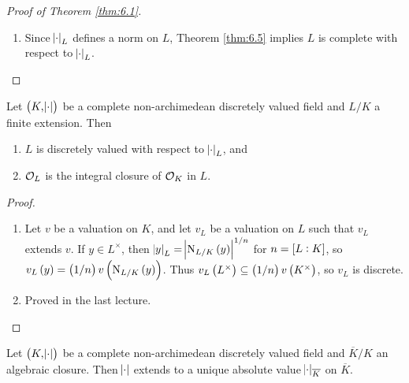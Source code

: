 \begin{proof}[Proof of Theorem \ref{thm:6.1}]
\begin{enumerate}
\begin{enumerate}[label=\arabic*.]
\end{enumerate}
To check $ \abs{\cdot}_L $ extends $ \abs{\cdot} $ use $ \N_{L / K}\br{x} = x^n $ for $ x \in K $. If $ \abs{\cdot}_L' $ is another absolute value on $ L $ extending $ \abs{\cdot} $, then note that $ \abs{\cdot}_L $ and $ \abs{\cdot}_L' $ are norms on $ L $. By Theorem \ref{thm:6.5}, $ \abs{\cdot}_L' $ and $ \abs{\cdot}_L $ induce the same topology on $ L $, so $ \abs{\cdot}_L' = \abs{\cdot}_L^c $ for some $ c > 0 $. Since $ \abs{\cdot}_L' $ extends $ \abs{\cdot} $, we have $ c = 1 $.
\item Since $ \abs{\cdot}_L $ defines a norm on $ L $, Theorem \ref{thm:6.5} implies $ L $ is complete with respect to $ \abs{\cdot}_L $.
\end{enumerate}
\end{proof}


\begin{corollary}
Let $ \br{K, \abs{\cdot}} $ be a complete non-archimedean discretely valued field and $ L / K $ a finite extension. Then
\begin{enumerate}
\item $ L $ is discretely valued with respect to $ \abs{\cdot}_L $, and
\item $ \mathcal{O}_L $ is the integral closure of $ \mathcal{O}_K $ in $ L $.
\end{enumerate}
\end{corollary}

\begin{proof}
\hfill
\begin{enumerate}
\item Let $ v $ be a valuation on $ K $, and let $ v_L $ be a valuation on $ L $ such that $ v_L $ extends $ v $. If $ y \in L^\times $, then $ \abs{y}_L = \abs{\N_{L / K}\br{y}}^{1 / n} $ for $ n = \sbr{L : K} $, so $ v_L\br{y} = \br{1 / n}v\br{\N_{L / K}\br{y}} $. Thus $ v_L\br{L^\times} \subseteq \br{1 / n}v\br{K^\times} $, so $ v_L $ is discrete.
\item Proved in the last lecture.
\end{enumerate}
\end{proof}

\begin{corollary}
Let $ \br{K, \abs{\cdot}} $ be a complete non-archimedean discretely valued field and $ \overline{K} / K $ an algebraic closure. Then $ \abs{\cdot} $ extends to a unique absolute value $ \abs{\cdot}_{\overline{K}} $ on $ \overline{K} $.
\end{corollary}


